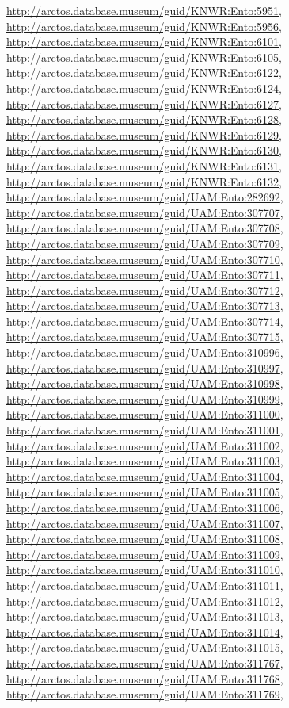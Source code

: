 \documentclass[9pt, article]{memoir}
\begin{document}
\begin{multicols}{2}
\url{http://arctos.database.museum/guid/KNWR:Ento:5951}, 
\url{http://arctos.database.museum/guid/KNWR:Ento:5956}, 
\url{http://arctos.database.museum/guid/KNWR:Ento:6101}, 
\url{http://arctos.database.museum/guid/KNWR:Ento:6105}, 
\url{http://arctos.database.museum/guid/KNWR:Ento:6122}, 
\url{http://arctos.database.museum/guid/KNWR:Ento:6124}, 
\url{http://arctos.database.museum/guid/KNWR:Ento:6127}, 
\url{http://arctos.database.museum/guid/KNWR:Ento:6128}, 
\url{http://arctos.database.museum/guid/KNWR:Ento:6129}, 
\url{http://arctos.database.museum/guid/KNWR:Ento:6130}, 
\url{http://arctos.database.museum/guid/KNWR:Ento:6131}, 
\url{http://arctos.database.museum/guid/KNWR:Ento:6132}, 
\url{http://arctos.database.museum/guid/UAM:Ento:282692}, 
\url{http://arctos.database.museum/guid/UAM:Ento:307707}, 
\url{http://arctos.database.museum/guid/UAM:Ento:307708}, 
\url{http://arctos.database.museum/guid/UAM:Ento:307709}, 
\url{http://arctos.database.museum/guid/UAM:Ento:307710}, 
\url{http://arctos.database.museum/guid/UAM:Ento:307711}, 
\url{http://arctos.database.museum/guid/UAM:Ento:307712}, 
\url{http://arctos.database.museum/guid/UAM:Ento:307713}, 
\url{http://arctos.database.museum/guid/UAM:Ento:307714}, 
\url{http://arctos.database.museum/guid/UAM:Ento:307715}, 
\url{http://arctos.database.museum/guid/UAM:Ento:310996}, 
\url{http://arctos.database.museum/guid/UAM:Ento:310997}, 
\url{http://arctos.database.museum/guid/UAM:Ento:310998}, 
\url{http://arctos.database.museum/guid/UAM:Ento:310999}, 
\url{http://arctos.database.museum/guid/UAM:Ento:311000}, 
\url{http://arctos.database.museum/guid/UAM:Ento:311001}, 
\url{http://arctos.database.museum/guid/UAM:Ento:311002}, 
\url{http://arctos.database.museum/guid/UAM:Ento:311003}, 
\url{http://arctos.database.museum/guid/UAM:Ento:311004}, 
\url{http://arctos.database.museum/guid/UAM:Ento:311005}, 
\url{http://arctos.database.museum/guid/UAM:Ento:311006}, 
\url{http://arctos.database.museum/guid/UAM:Ento:311007}, 
\url{http://arctos.database.museum/guid/UAM:Ento:311008}, 
\url{http://arctos.database.museum/guid/UAM:Ento:311009}, 
\url{http://arctos.database.museum/guid/UAM:Ento:311010}, 
\url{http://arctos.database.museum/guid/UAM:Ento:311011}, 
\url{http://arctos.database.museum/guid/UAM:Ento:311012}, 
\url{http://arctos.database.museum/guid/UAM:Ento:311013}, 
\url{http://arctos.database.museum/guid/UAM:Ento:311014}, 
\url{http://arctos.database.museum/guid/UAM:Ento:311015}, 
\url{http://arctos.database.museum/guid/UAM:Ento:311767}, 
\url{http://arctos.database.museum/guid/UAM:Ento:311768}, 
\url{http://arctos.database.museum/guid/UAM:Ento:311769}, 

\end{multicols}
\end{document}
